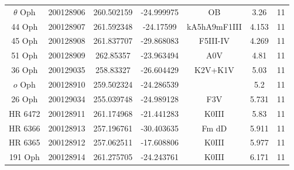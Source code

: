 \begin{table*}
\begin{tabular}{ccccccc}
$\theta$ Oph & 200128906 & 260.502159 & -24.999975 & OB & 3.26 & 11 \\
44 Oph & 200128907 & 261.592348 & -24.17599 & kA5hA9mF1III & 4.153 & 11 \\
45 Oph & 200128908 & 261.837707 & -29.868083 & F5III-IV & 4.269 & 11 \\
51 Oph & 200128909 & 262.85357 & -23.963494 & A0V & 4.81 & 11 \\
36 Oph & 200129035 & 258.83327 & -26.604429 & K2V+K1V & 5.03 & 11 \\
$o$ Oph & 200128910 & 259.502324 & -24.286539 &  & 5.2 & 11 \\
26 Oph & 200129034 & 255.039748 & -24.989128 & F3V & 5.731 & 11 \\
HR 6472 & 200128911 & 261.174968 & -21.441283 & K0III & 5.83 & 11 \\
HR 6366 & 200128913 & 257.196761 & -30.403635 & Fm dD & 5.911 & 11 \\
HR 6365 & 200128912 & 257.062511 & -17.608806 & K0III & 5.977 & 11 \\
191 Oph & 200128914 & 261.275705 & -24.243761 & K0III & 6.171 & 11 \\
\hline
\end{tabular}
\end{table*}
